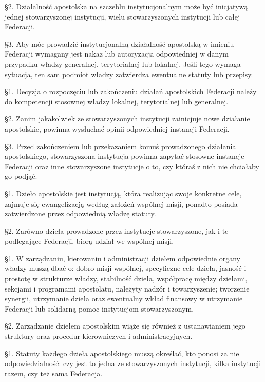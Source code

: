 \S{}2. Działalność apostolska na szczeblu instytucjonalnym może być inicjatywą jednej stowarzyszonej instytucji, wielu stowarzyszonych instytucji lub całej Federacji.


\S{}3. Aby móc prowadzić instytucjonalną działalność apostolską w imieniu Federacji wymagany jest nakaz lub autoryzacja odpowiedniej w danym przypadku władzy generalnej, terytorialnej lub lokalnej. Jeśli tego wymaga sytuacja, ten sam podmiot władzy zatwierdza ewentualne statuty lub przepisy.
 
 
 \S{}1. Decyzja o rozpoczęciu lub zakończeniu działań apostolskich Federacji należy do kompetencji stosownej władzy lokalnej, terytorialnej lub generalnej.


\S{}2. Zanim jakakolwiek ze stowarzyszonych instytucji zainicjuje nowe działanie apostolskie, powinna wysłuchać opinii odpowiedniej instancji Federacji.


\S{}3. Przed zakończeniem lub przekazaniem komuś prowadzonego działania apostolskiego, stowarzyszona instytucja powinna zapytać stosowne instancje Federacji oraz inne stowarzyszone instytucje o to, czy któraś z nich nie chciałaby go podjąć.
 
 
 \S{}1. Dzieło apostolskie jest instytucją, która realizując swoje konkretne cele, zajmuje się ewangelizacją według założeń wspólnej misji, ponadto posiada zatwierdzone przez odpowiednią władzę statuty.


\S{}2. Zarówno dzieła prowadzone przez instytucje stowarzyszone, jak i te podlegające Federacji, biorą udział we wspólnej misji.
 
 
 \S{}1. W zarządzaniu, kierowaniu i administracji dziełem odpowiednie organy władzy muszą dbać o: dobro misji wspólnej, specyficzne cele dzieła, jasność i prostotę w strukturze władzy, stabilność dzieła, współpracę między dziełami, sekcjami i programami apostolatu, należyty nadzór i towarzyszenie; tworzenie synergii, utrzymanie dzieła oraz ewentualny wkład finansowy w utrzymanie Federacji lub solidarną pomoc instytucjom stowarzyszonym.


\S{}2. Zarządzanie dziełem apostolskim wiąże się również z ustanawianiem jego struktury oraz procedur kierowniczych i administracyjnych.


 \S{}1. Statuty każdego dzieła apostolskiego muszą określać, kto ponosi za nie odpowiedzialność: czy jest to jedna ze stowarzyszonych instytucji, kilka instytucji razem, czy też sama Federacja.


